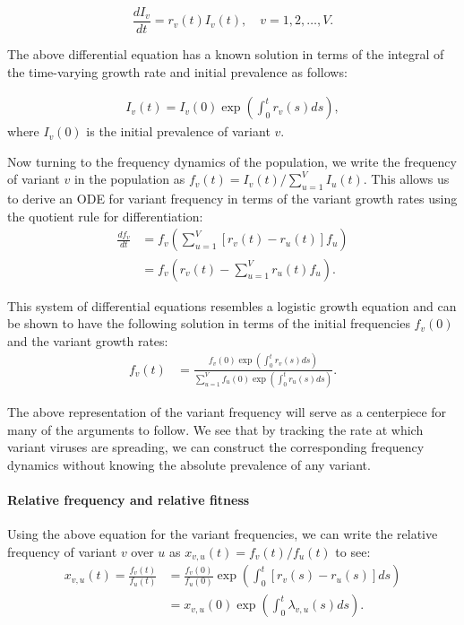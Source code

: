\documentclass[12pt,oneside,letterpaper]{article}
\begin{document}
\begin{equation} \label{eq:inhomo_exp_growth}
    \frac{d I_{v}}{d t} = r_{v}(t) I_{v}(t), \quad v = 1,2, \ldots, V.
\end{equation}

The above differential equation has a known solution in terms of the integral of the time-varying growth rate and initial prevalence as follows:

\begin{align*}
I_{v}(t) = I_{v}(0) \exp\left( \int_{0}^{t} r_{v}(s) ds\right),
\end{align*}
where $I_{v}(0)$ is the initial prevalence of variant $v$.

Now turning to the frequency dynamics of the population, we write the frequency of variant $v$ in the population as  $f_{v}(t) = I_{v}(t) / \sum_{u=1}^{V} I_{u}(t)$.
This allows us to derive an ODE for variant frequency in terms of the variant growth rates using the quotient rule for differentiation:
\begin{align*}
    \frac{d f_{v}}{d t} &= f_{v} \left( \sum_{u=1}^{V} [r_{v}(t) - r_{u}(t)] f_{u} \right)\\
                        &= f_{v} \left( r_{v}(t) - \sum_{u=1}^{V} r_{u}(t) f_{u} \right).
\end{align*}

This system of differential equations resembles a logistic growth equation and can be shown to have the following solution in terms of the initial frequencies $f_{v}(0)$ and the variant growth rates:
\begin{align}
    f_{v}(t) &= \frac{ f_{v}(0) \exp( \int_{0}^{t} r_{v}(s) ds)}{\sum_{u=1}^{V}  f_{u}(0) \exp( \int_{0}^{t} r_{u}(s) ds)}.
\end{align}

The above representation of the variant frequency will serve as a centerpiece for many of the arguments to follow.
We see that by tracking the rate at which variant viruses are spreading, we can construct the corresponding frequency dynamics without knowing the absolute prevalence of any variant.

\paragraph{Relative frequency and relative fitness}%

Using the above equation for the variant frequencies, we can write the relative frequency of variant $v$ over $u$ as $x_{v,u}(t) = f_{v}(t) / f_{u}(t)$ to see:
\begin{align*}
    x_{v, u}(t) = \frac{f_{v}(t)}{f_{u}(t)} &= \frac{f_{v}(0)}{f_{u}(0)} \exp \left( \int_{0}^{t} [r_{v}(s) - r_{u}(s)] ds \right)\\
                                            &=x_{v,u}(0)\exp \left( \int_{0}^{t} \lambda_{v,u}(s) ds \right).
\end{align*}
\end{document}
